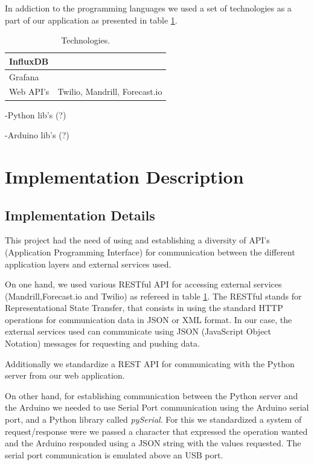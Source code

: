 \documentclass[12pt]{report}
\begin{document}
In addiction to the programming languages we used a set of technologies as a part of our application as presented in table \ref{tab:tech}.

\begin{table}[H]
\begin{tabularx}{0.8\textwidth}{ |l|X| }
  	\hline
  	InfluxDB  &   \\
 	\hline
 	Grafana  &   \\
  	\hline
 	Web API's & Twilio, Mandrill, Forecast.io   \\
	\hline
\end{tabularx}
	\caption{Technologies.}
  	\label{tab:tech}
\end{table}

-Python lib's (?)

-Arduino lib's (?)

\section{Implementation Description}

\subsection{Implementation Details}

This project had the need of using and establishing a diversity of API's (Application Programming Interface) for communication between the different application layers and external services used.

On one hand, we used various RESTful API for accessing external services (Mandrill\cite{mandrillapi},Forecast.io\cite{fcapi} and Twilio\cite{twilioapi}) as refereed in table \ref{tab:tech}. The RESTful stands for Representational State Transfer, that consists in using the standard HTTP operations for communication data in JSON or XML format. In our case, the external services used can communicate using JSON (JavaScript Object Notation) messages for requesting and pushing data.

Additionally we standardize a REST API for communicating with the Python server from our web application.

On other hand, for establishing communication between the Python server and the Arduino we needed to use Serial Port communication using the Arduino serial port\cite{serial}, and a Python library called \textit{pySerial}\cite{pyserial}. For this we standardized a system of request/response were we passed a character that expressed the operation wanted and the Arduino responded using a JSON string with the values requested. The serial port communication is emulated above an USB port.
\end{document}
